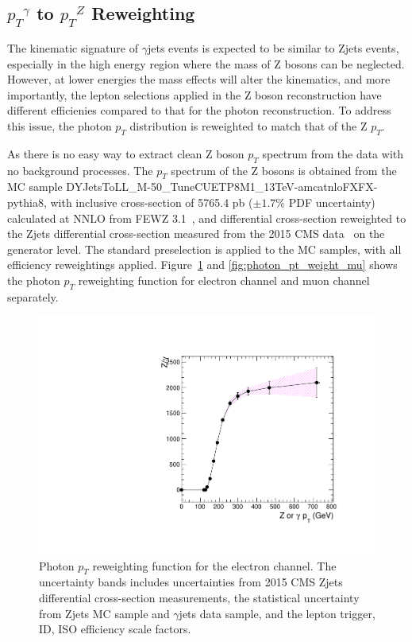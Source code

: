 \subsection{${p_T}^{\gamma}$ to ${p_T}^Z$ Reweighting}\label{sec:bg_gjetpt}
The kinematic signature of $\gamma$jets events is expected to be similar to Zjets events, especially in the high energy region where the mass of Z bosons can be neglected. However, at lower energies the mass effects will alter the kinematics, and more importantly, the lepton selections applied in the Z boson reconstruction have different efficienies compared to that for the photon reconstruction. To address this issue, the photon $p_T$ distribution is reweighted to match that of the Z $p_T$. 

\vspace{0.3cm}
As there is no easy way to extract clean Z boson $p_T$ spectrum from the data with no background processes. The $p_T$ spectrum of the Z bosons is obtained from the MC sample DYJetsToLL\_M-50\_TuneCUETP8M1\_13TeV-amcatnloFXFX-pythia8, with inclusive cross-section of 5765.4 pb ($\pm 1.7\%$ PDF uncertainty) calculated at NNLO from FEWZ 3.1~\cite{bg_fewz}, and differential cross-section reweighted to the Zjets differential cross-section measured from the 2015 CMS data~\cite{bg_2015zjetxsec} on the generator level. The standard preselection is applied to the MC samples, with all efficiency reweightings applied. Figure~\ref{fig:photon_pt_weight_el} and \ref{fig:photon_pt_weight_mu} shows the photon $p_T$ reweighting function for electron channel and muon channel separately. 

\begin{figure}[htbp]
\centering
  \includegraphics[width=0.9\linewidth]{figures/study_gjets_data_allcorV2_modify_el.pdf}
  \caption{Photon $p_T$ reweighting function for the electron channel.
 The uncertainty bands includes uncertainties from 2015 CMS Zjets differential cross-section measurements, the statistical uncertainty from Zjets MC sample and $\gamma$jets data sample, and the lepton trigger, ID, ISO efficiency scale factors.}
  \label{fig:photon_pt_weight_el}
\end{figure}

